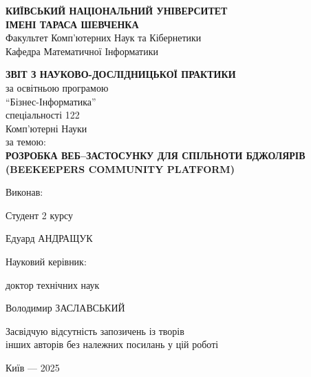 \begin{titlepage}
    \centering
    \vspace{1cm}

    {\bfseries\Large КИЇВСЬКИЙ НАЦІОНАЛЬНИЙ УНІВЕРСИТЕТ\\}
    {\bfseries\Large ІМЕНІ ТАРАСА ШЕВЧЕНКА\\}
    \vspace{0.5cm}
    {\large Факультет Комп'ютерних Наук та Кібернетики\\}
    \vspace{0.5cm}
    {\large Кафедра Математичної Інформатики\\}
    \vspace{1.5cm}

    {\bfseries\Large ЗВІТ З НАУКОВО-ДОСЛІДНИЦЬКОЇ ПРАКТИКИ\\}
    \vspace{0.2cm}
    {\large за освітньою програмою\\}
    \vspace{0.2cm}
    {\large \enquote{Бізнес-Інформатика}}\\
    {\large спеціальності 122\\}
    {\large Комп'ютерні Науки\\}
    \vspace{0.2cm}
    {\large за темою:\\}
    \vspace{0.2cm}
    {\bfseries\Large РОЗРОБКА ВЕБ–ЗАСТОСУНКУ ДЛЯ СПІЛЬНОТИ БДЖОЛЯРІВ (BEEKEEPERS COMMUNITY PLATFORM)\\}
    \vspace{2cm}

    \begin{flushleft}
        Виконав:
        
        Студент 2 курсу
        
        Едуард АНДРАЩУК
        
        \vspace{1.5cm}
        Науковий керівник:
        
        доктор технічних наук
        
        Володимир ЗАСЛАВСЬКИЙ

        
    \end{flushleft}
    
    \vspace{1cm}
    \begin{flushright}
        {\small Засвідчую відсутність запозичень із творів\\}
        {\small інших авторів без належних посилань у цій роботі\\}
    \end{flushright}
    

    \vfill 

    Київ — 2025

\end{titlepage} 